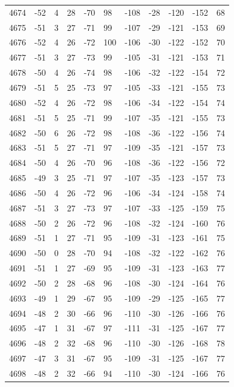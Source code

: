 \begin{table}[H]
\begin{tabular}{lllllllllll}
4674 & -52 & 4 & 28 & -70 & 98 & -108 & -28 & -120 & -152 & 68 \\
4675 & -51 & 3 & 27 & -71 & 99 & -107 & -29 & -121 & -153 & 69 \\
4676 & -52 & 4 & 26 & -72 & 100 & -106 & -30 & -122 & -152 & 70 \\
4677 & -51 & 3 & 27 & -73 & 99 & -105 & -31 & -121 & -153 & 71 \\
4678 & -50 & 4 & 26 & -74 & 98 & -106 & -32 & -122 & -154 & 72 \\
4679 & -51 & 5 & 25 & -73 & 97 & -105 & -33 & -121 & -155 & 73 \\
4680 & -52 & 4 & 26 & -72 & 98 & -106 & -34 & -122 & -154 & 74 \\
4681 & -51 & 5 & 25 & -71 & 99 & -107 & -35 & -121 & -155 & 73 \\
4682 & -50 & 6 & 26 & -72 & 98 & -108 & -36 & -122 & -156 & 74 \\
4683 & -51 & 5 & 27 & -71 & 97 & -109 & -35 & -121 & -157 & 73 \\
4684 & -50 & 4 & 26 & -70 & 96 & -108 & -36 & -122 & -156 & 72 \\
4685 & -49 & 3 & 25 & -71 & 97 & -107 & -35 & -123 & -157 & 73 \\
4686 & -50 & 4 & 26 & -72 & 96 & -106 & -34 & -124 & -158 & 74 \\
4687 & -51 & 3 & 27 & -73 & 97 & -107 & -33 & -125 & -159 & 75 \\
4688 & -50 & 2 & 26 & -72 & 96 & -108 & -32 & -124 & -160 & 76 \\
4689 & -51 & 1 & 27 & -71 & 95 & -109 & -31 & -123 & -161 & 75 \\
4690 & -50 & 0 & 28 & -70 & 94 & -108 & -32 & -122 & -162 & 76 \\
4691 & -51 & 1 & 27 & -69 & 95 & -109 & -31 & -123 & -163 & 77 \\
4692 & -50 & 2 & 28 & -68 & 96 & -108 & -30 & -124 & -164 & 76 \\
4693 & -49 & 1 & 29 & -67 & 95 & -109 & -29 & -125 & -165 & 77 \\
4694 & -48 & 2 & 30 & -66 & 96 & -110 & -30 & -126 & -166 & 76 \\
4695 & -47 & 1 & 31 & -67 & 97 & -111 & -31 & -125 & -167 & 77 \\
4696 & -48 & 2 & 32 & -68 & 96 & -110 & -30 & -126 & -168 & 78 \\
4697 & -47 & 3 & 31 & -67 & 95 & -109 & -31 & -125 & -167 & 77 \\
4698 & -48 & 2 & 32 & -66 & 94 & -110 & -30 & -124 & -166 & 76 \\

\end{tabular}
\end{table}

